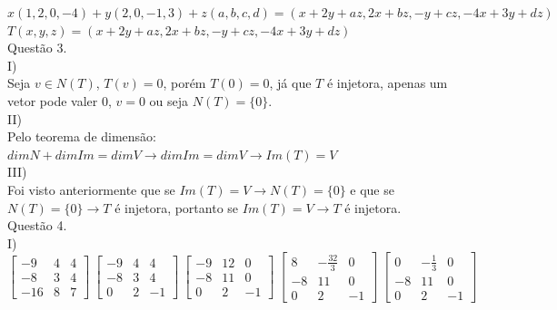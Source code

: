 \documentclass[12pt]{article}
\begin{document}
$x(1,2,0,-4)+y(2,0,-1,3)+z(a,b,c,d)=(x+2y+az,2x+bz,-y+cz,-4x+3y+dz)$\\

$T(x,y,z)=(x+2y+az,2x+bz,-y+cz,-4x+3y+dz)$\\

\noindent Questão 3.\\

\noindent I)\\

Seja $v\in N(T)$, $T(v)=0$, porém $T(0)=0$, já que $T$ é injetora, apenas um vetor pode valer $0$, $v=0$ ou seja $N(T)=\lbrace0\rbrace$.\\

\noindent II)\\

Pelo teorema de dimensão: $dimN + dimIm = dimV\longrightarrow dimIm = dimV\longrightarrow Im(T)=V$\\

\noindent III)\\

Foi visto anteriormente que se $Im(T)=V\longrightarrow N(T)=\lbrace0\rbrace$ e que se $N(T)=\lbrace0\rbrace\longrightarrow T$ é injetora, portanto se $Im(T)=V\longrightarrow T$ é injetora.\\

\noindent Questão 4.\\

\noindent I)\\

$\begin{bmatrix}-9&4&4\\-8&3&4\\-16&8&7\end{bmatrix}~\begin{bmatrix}-9&4&4\\-8&3&4\\0&2&-1\end{bmatrix}~\begin{bmatrix}-9&12&0\\-8&11&0\\0&2&-1\end{bmatrix}~\begin{bmatrix}8&-\frac{32}{3}&0\\-8&11&0\\0&2&-1\end{bmatrix}~\begin{bmatrix}0&-\frac{1}{3}&0\\-8&11&0\\0&2&-1\end{bmatrix}$\\
\end{document}
